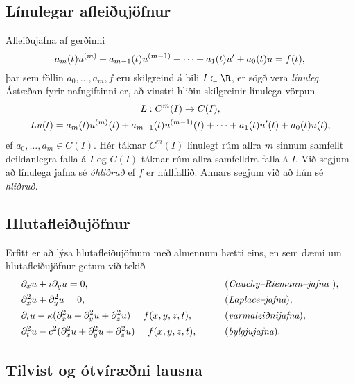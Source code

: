 \subsection*{Línulegar afleiðujöfnur}

Afleiðujafna af gerðinni 
 \begin{equation*}a_m(t)u\sp{(m)}+a_{m-1}(t)u\sp{(m-1)}+\cdots+a_1(t)u'+a_0(t)u=f(t),
\label{1.1.5}
 \end{equation*}
þar sem föllin $a_0,\dots,a_m,f$ eru skilgreind á bili $I\subset \R$,
er sögð vera {\it línuleg}.  Ástæðan
fyrir nafngiftinni er, að vinstri hliðin skilgreinir línulega vörpun
\begin{gather*}
L:C\sp m(I)\to C(I),\\
Lu(t)=
a_m(t)u\sp{(m)}(t)+a_{m-1}(t)u\sp{(m-1)}(t)+
\cdots+a_1(t)u'(t)+a_0(t)u(t),
\end{gather*}
ef $a_0,\dots,a_m\in C(I)$.
Hér táknar $C^m(I)$ línulegt rúm allra $m$ sinnum samfellt deildanlegra
falla á $I$ og $C(I)$ táknar rúm allra samfelldra falla á $I$.  
Við segjum að línulega jafna  sé {\it
óhliðruð} ef $f$ er núllfallið.
Annars segjum við að hún sé {\it
hliðruð}.  

\subsection*{Hlutafleiðujöfnur}

Erfitt er að lýsa hlutafleiðujöfnum 
með almennum hætti eins, en sem dæmi um hlutafleiðujöfnur
getum við tekið
\begin{alignat*}{2}
&\partial_xu+i\partial_yu=0,& \qquad
&\text{({\it
Cauchy--Riemann--jafna\index{Cauchy--Riemann!jafna}
\index{jafna!Cauchy--Riemann}})},\\
&\partial_x\sp 2u+\partial_y\sp 2u=0,&\qquad
&\text{({\it Laplace--jafna\index{Laplace!jafna}\index{jafna!Laplace}})},\\
&\partial_tu-\kappa(\partial_x\sp 2u+\partial_y\sp 2u+\partial_z\sp
2u)=f(x,y,z,t),& \qquad
&\text{({\it varmaleiðnijafna\index{varmaleiðnijafna}})},\\
&\partial_t^2u-c^2(\partial_x\sp 2u+\partial_y\sp 2u+\partial_z\sp
2u)=f(x,y,z,t),& \qquad
&\text{({\it bylgjujafna\index{bylgjujafna}})}.
\end{alignat*}

\subsection*{Tilvist og ótvíræðni lausna}

